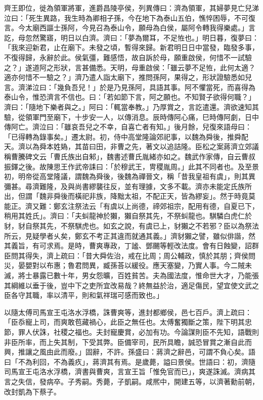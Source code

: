 \begin{pinyinscope}
齊王即位，徙為領軍將軍，進爵昌陵亭侯，列異傳曰：濟為領軍，其婦夢見亡兒涕泣曰：「死生異路，我生時為卿相子孫，今在地下為泰山五伯，憔悴困辱，不可復言。今太廟西謳士孫阿，今見召為泰山令，願母為白侯，屬阿令轉我得樂處。」言訖，母忽然驚寤，明日以白濟。濟曰：「夢為爾耳，不足恠也。」明日暮，復夢曰：「我來迎新君，止在廟下。未發之頃，暫得來歸。新君明日日中當發，臨發多事，不復得歸，永辭於此。侯氣彊，難感悟，故自訴於母，願重啟侯，何惜不一試驗之？」遂道阿之形狀，言甚備悉。天明，母重啟侯：「雖云夢不足恠，此何太適？適亦何惜不一驗之？」濟乃遣人詣太廟下，推問孫阿，果得之，形狀證驗悉如兒言。濟涕泣曰：「幾負吾兒！」於是乃見孫阿，具語其事。阿不懼當死，而喜得為泰山令，惟恐濟言不信也。曰：「若如節下言，阿之願也。不知賢子欲得何職？」濟曰：「隨地下樂者與之。」阿曰：「輒當奉教。」乃厚賞之，言訖遣還。濟欲速知其驗，從領軍門至廟下，十步安一人，以傳消息。辰時傳阿心痛，巳時傳阿劇，日中傳阿亡。濟泣曰：「雖哀吾兒之不幸，自喜亡者有知。」後月餘，兒復來語母曰：「已得轉為錄事矣。」遷太尉。初，侍中高堂隆論郊祀事，以魏為舜後，推舜配天。濟以為舜本姓媯，其苗曰田，非曹之先，著文以追詰隆。臣松之案蔣濟立郊議稱曹騰碑文云「曹氏族出自邾」，魏書述曹氏胤緒亦如之。魏武作家傳，自云曹叔振鐸之後。故陳思王作武帝誄曰：「於穆武王，冑稷胤周。」此其不同者也。及至景初，明帝從高堂隆議，謂魏為舜後，後魏為禪晉文，稱「昔我皇祖有虞」，則其異彌甚。尋濟難隆，及與尚書繆襲往反，並有理據，文多不載。濟亦未能定氏族所出，但謂「魏非舜後而橫祀非族，降黜太祖，不配正天，皆為繆妄」。然于時竟莫能正。濟又難：鄭玄注祭法云「有虞以上尚德，禘郊祖宗，配用有德，自夏已下，稍用其姓氏」。濟曰：「夫虯龍神於獺，獺自祭其先，不祭虯龍也。騏驎白虎仁於豺，豺自祭其先，不祭騏虎也。如玄之說，有虞已上，豺獺之不若邪？臣以為祭法所云，見疑學者乆矣，鄭玄不考正其違而就通其義。」濟豺獺之譬，雖似俳諧，然其義旨，有可求焉。是時，曹爽專政，丁謐、鄧颺等輕改法度。會有日蝕變，詔群臣問其得失，濟上疏曰：「昔大舜佐治，戒在比周；周公輔政，慎於其朋；齊侯問災，晏嬰對以布惠；魯君問異，臧孫荅以緩役。應天塞變，乃實人事。今二賊未滅，將士暴露已數十年，男女怨曠，百姓貧苦。夫為國法度，惟命世大才，乃能張其綱維以垂于後，豈中下之吏所宜改易哉？終無益於治，適足傷民，望宜使文武之臣各守其職，率以清平，則和氣祥瑞可感而致也。」

以隨太傅司馬宣王屯洛水浮橋，誅曹爽等，進封都鄉侯，邑七百戶。濟上疏曰：「臣忝寵上司，而爽敢苞藏禍心，此臣之無任也。太傅奮獨斷之策，陛下明其忠節，罪人伏誅，社稷之福也。夫封寵慶賞，必加有功。今論謀則臣不先知，語戰則非臣所率，而上失其制，下受其弊。臣備宰司，民所具瞻，誠恐冒賞之漸自此而興，推讓之風由此而廢。」固辭，不許。孫盛曰：蔣濟之辭邑，可謂不負心矣。語曰「不為利回，不為義疚」，蔣濟其有焉。是歲薨，謚曰景侯。世語曰：初，濟隨司馬宣王屯洛水浮橋，濟書與曹爽，言宣王旨「惟免官而已」，爽遂誅滅。濟病其言之失信，發病卒。子秀嗣。秀薨，子凱嗣。咸熈中，開建五等，以濟著勳前朝，改封凱為下蔡子。


\end{pinyinscope}